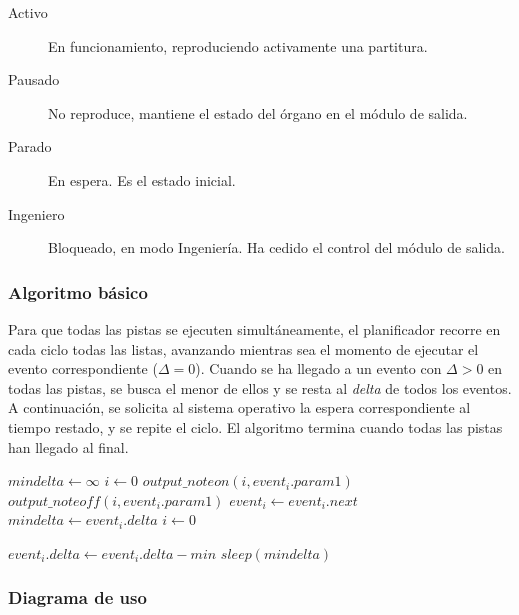 \smallskip

\begin{description}
	\item[Activo] En funcionamiento, reproduciendo activamente una partitura.
	\item[Pausado] No reproduce, mantiene el estado del órgano en el módulo de salida.
	\item[Parado] En espera. Es el estado inicial.
	\item[Ingeniero] Bloqueado, en modo Ingeniería. Ha cedido el control del módulo de salida.
\end{description}

\subsubsection{Algoritmo básico}

Para que todas las pistas se ejecuten simultáneamente, el planificador recorre en cada ciclo todas las listas, avanzando mientras sea el momento de ejecutar el evento correspondiente ($\Delta=0$). Cuando se ha llegado a un evento con $\Delta > 0$ en todas las pistas, se busca el menor de ellos y se resta al \textit{delta} de todos los eventos. A continuación, se solicita al sistema operativo la espera correspondiente al tiempo restado, y se repite el ciclo. El algoritmo termina cuando todas las pistas han llegado al final.

\smallskip

\begin{algorithmic}
	\LOOP
		\STATE $mindelta \gets \infty$
		\STATE $i\gets 0$
					\STATE $output\_noteon(i, event_i.param1)$
				\ELSE 
						\STATE $output\_noteoff (i, event_i.param1)$
					\ENDIF
				\ENDIF
				\STATE $event_i \gets event_i.next$
			\ENDWHILE
				\STATE $mindelta \gets event_i.delta$
			\ENDIF
		\ENDWHILE
		\STATE $i \gets 0$
		
			\STATE $event_i.delta \gets event_i.delta - min$
		\ENDWHILE
		\STATE $sleep (mindelta)$
	\ENDLOOP
\end{algorithmic}

\smallskip

\subsubsection{Diagrama de uso}

